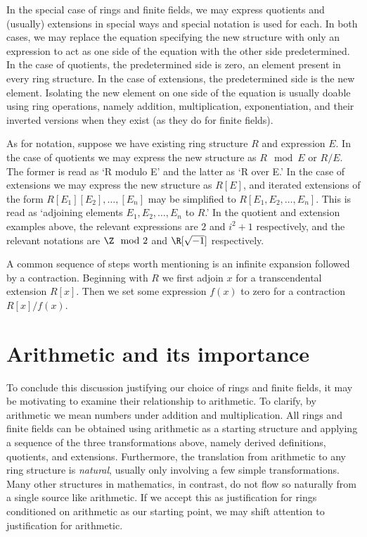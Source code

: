 In the special case of rings and finite fields, we may express quotients and (usually) extensions in special ways and special notation is used for each.
In both cases, we may replace the equation specifying the new structure with only an expression to act as one side of the equation with the other side predetermined.
In the case of quotients, the predetermined side is zero, an element present in every ring structure.
In the case of extensions, the predetermined side is the new element.
Isolating the new element on one side of the equation is usually doable using ring operations, namely addition, multiplication, exponentiation, and their inverted versions when they exist (as they do for finite fields).

As for notation, suppose we have existing ring structure $R$ and expression $E$.
In the case of quotients we may express the new structure as $R\mod E$ or $R/E$. 
The former is read as `R modulo E' and the latter as `R over E.'
In the case of extensions we may express the new structure as $R[E]$, and iterated extensions of the form $R[E_1][E_2],\dots,[E_n]$ may be simplified to $R[E_1,E_2,\dots,E_n]$.
This is read as `adjoining elements $E_1,E_2,\dots,E_n$ to $R$.'
In the quotient and extension examples above, the relevant expressions are $2$ and $i^2+1$ respectively, and the relevant notations are $\Z\mod 2$ and $\R[\sqrt{-1}]$ respectively.

A common sequence of steps worth mentioning is an infinite expansion followed by a contraction.
Beginning with $R$ we first adjoin $x$ for a transcendental extension $R[x]$.
Then we set some expression $f(x)$ to zero for a contraction $R[x]/f(x)$.


\section{Arithmetic and its importance}

To conclude this discussion justifying our choice of rings and finite fields, it may be motivating to examine their relationship to arithmetic.
To clarify, by arithmetic we mean numbers under addition and multiplication.
All rings and finite fields can be obtained using arithmetic as a starting structure and applying a sequence of the three transformations above, namely derived definitions, quotients, and extensions.
Furthermore, the translation from arithmetic to any ring structure is \emph{natural}, usually only involving a few simple transformations.
Many other structures in mathematics, in contrast, do not flow so naturally from a single source like arithmetic.
If we accept this as justification for rings conditioned on arithmetic as our starting point, we may shift attention to justification for arithmetic. 

